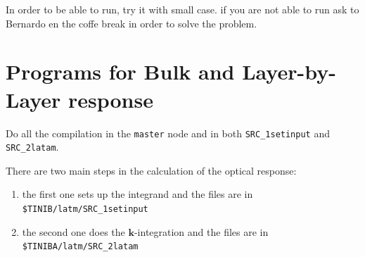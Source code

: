 \documentclass[openany,oneside]{book}
\numberwithin{equation}{section}
\begin{document}
In order to be able to run, try it with small case. 
if you are not able to run ask to Bernardo en the coffe 
break in order to solve the problem. 

\section{Programs for Bulk and Layer-by-Layer response}
\label{sec:programs}

Do all the compilation in the \verb=master= node and in both 
\verb=SRC_1setinput=
and
\verb=SRC_2latam=.

There are two main steps in the calculation of the optical response:

\begin{enumerate}

\item the first one sets up the integrand and the
files are in\\
\verb=$TINIB/latm/SRC_1setinput=
\item the second one does the $\mathbf{k}$-integration and the files
  are in\\
\verb=$TINIBA/latm/SRC_2latam=
\end{enumerate}
\end{document}

